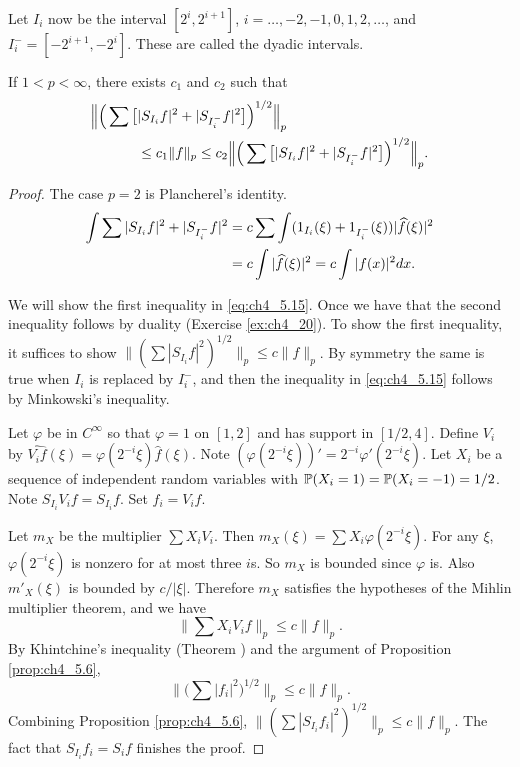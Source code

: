 Let $I_i$ now be the interval $[2^i,2^{i+1}]$, $i = \ldots,-2,-1,0,1,2,\ldots$, and $I_i^- = [-2^{i+1},-2^i]$. These are called the dyadic intervals.

\begin{theorem}\label{thm:ch4_5.7}
If $1 < p < \infty$, there exists $c_1$ and $c_2$ such that
\begin{align}\label{eq:ch4_5.15}
    \Big\|\Big(\sum\big[&|S_{I_i}f|^2 + |S_{I_i^-}f|^2\big]\Big)^{1/2}\Big\|_p \\
    &\leq c_1\|f\|_p \leq c_2\Big\|\Big(\sum\big[|S_{I_i}f|^2 + |S_{I_i^-}f|^2\big]\Big)^{1/2}\Big\|_p. \notag
\end{align}
\end{theorem}

\begin{proof}
The case $p = 2$ is Plancherel's identity.
\begin{align}\label{eq:ch4_5.16}
    \int \sum |S_{I_i}f|^2 + |S_{I_i^-}f|^2 &= c \sum \int (1_{I_i}(\xi) + 1_{I_i^-}(\xi))|\widehat{f}(\xi)|^2 \\
    &= c \int |\widehat{f}(\xi)|^2 = c \int |f(x)|^2dx. \notag
\end{align}

We will show the first inequality in \eqref{eq:ch4_5.15}. Once we have that the second inequality follows by duality (Exercise \ref{ex:ch4_20}). To show the first inequality, it suffices to show $\|(\sum |S_{I_i}f|^2)^{1/2}\|_p \leq c\|f\|_p$. By symmetry the same is true when $I_i$ is replaced by $I_i^-$, and then the inequality in \eqref{eq:ch4_5.15} follows by Minkowski's inequality.

Let $\varphi$ be in $C^\infty$ so that $\varphi = 1$ on $[1,2]$ and has support in $[1/2,4]$. Define $V_i$ by $\widehat{V_if}(\xi) = \varphi(2^{-i}\xi)\widehat{f}(\xi)$. Note $(\varphi(2^{-i}\xi))' = 2^{-i}\varphi'(2^{-i}\xi)$. Let $X_i$ be a sequence of independent random variables with $\P(X_i=1)=\P(X_i=-1)=1/2$. Note $S_{I_i}V_i f=S_{I_i}f$. Set $f_i=V_i f$.

Let $m_X$ be the multiplier $\sum X_iV_i$. Then $m_X(\xi)=\sum X_i\varphi(2^{-i}\xi)$. For any $\xi$, $\varphi(2^{-i}\xi)$ is nonzero for at most three $i$s. So $m_X$ is bounded since $\varphi$ is. Also $m'_X(\xi)$ is bounded by $c/|\xi|$. Therefore $m_X$ satisfies the hypotheses of the Mihlin multiplier theorem, and we have
\[
    \Big\|\sum X_iV_if\Big\|_p \leq c\|f\|_p.
\]
By Khintchine's inequality (Theorem ) and the argument of Proposition \ref{prop:ch4_5.6},
\[
    \Big\|\Big(\sum |f_i|^2\Big)^{1/2}\Big\|_p \leq c\|f\|_p.
\]
Combining Proposition \ref{prop:ch4_5.6}, $\|(\sum |S_{I_i}f_i|^2)^{1/2}\|_p\le c\|f\|_p$. The fact that $S_{I_i}f_i=S_if$ finishes the proof.
\end{proof}

